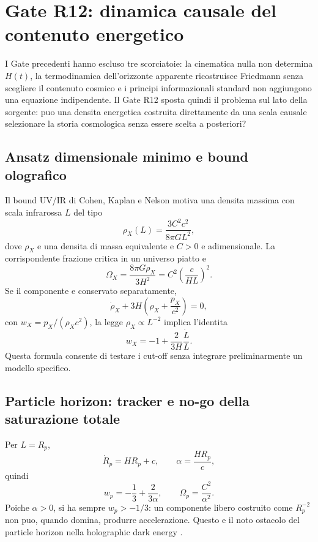 \documentclass[11pt,a4paper]{article}
\begin{document}
\section{Gate R12: dinamica causale del contenuto energetico}

I Gate precedenti hanno escluso tre scorciatoie: la cinematica nulla non determina $H(t)$, la termodinamica dell'orizzonte apparente ricostruisce Friedmann senza scegliere il contenuto cosmico e i principi informazionali standard non aggiungono una equazione indipendente. Il Gate R12 sposta quindi il problema sul lato della sorgente: puo una densita energetica costruita direttamente da una scala causale selezionare la storia cosmologica senza essere scelta a posteriori?

\subsection{Ansatz dimensionale minimo e bound olografico}

Il bound UV/IR di Cohen, Kaplan e Nelson motiva una densita massima con scala infrarossa $L$ del tipo \cite{CohenKaplanNelson1999}
\begin{equation}
 \boxed{\rho_X(L)=\frac{3C^2c^2}{8\pi G L^2}},
 \label{eq:r12_hde_density}
\end{equation}
dove $\rho_X$ e una densita di massa equivalente e $C>0$ e adimensionale. La corrispondente frazione critica in un universo piatto e
\begin{equation}
 \Omega_X=\frac{8\pi G\rho_X}{3H^2}
 =C^2\left(\frac{c}{HL}\right)^2.
 \label{eq:r12_omega_general}
\end{equation}
Se il componente e conservato separatamente,
\begin{equation}
 \dot\rho_X+3H\left(\rho_X+\frac{p_X}{c^2}\right)=0,
\end{equation}
con $w_X=p_X/(\rho_Xc^2)$, la legge $\rho_X\propto L^{-2}$ implica l'identita
\begin{equation}
 \boxed{w_X=-1+\frac{2}{3H}\frac{\dot L}{L}}.
 \label{eq:r12_w_general}
\end{equation}
Questa formula consente di testare i cut-off senza integrare preliminarmente un modello specifico.

\subsection{Particle horizon: tracker e no-go della saturazione totale}

Per $L=R_p$,
\begin{equation}
 \dot R_p=HR_p+c,\qquad \alpha=\frac{HR_p}{c},
\end{equation}
quindi
\begin{equation}
 \boxed{w_p=-\frac13+\frac{2}{3\alpha}},
 \qquad
 \boxed{\Omega_p=\frac{C^2}{\alpha^2}}.
 \label{eq:r12_particle_eos}
\end{equation}
Poiche $\alpha>0$, si ha sempre $w_p>-1/3$: un componente libero costruito come $R_p^{-2}$ non puo, quando domina, produrre accelerazione. Questo e il noto ostacolo del particle horizon nella holographic dark energy \cite{Li2004}.
\end{document}
